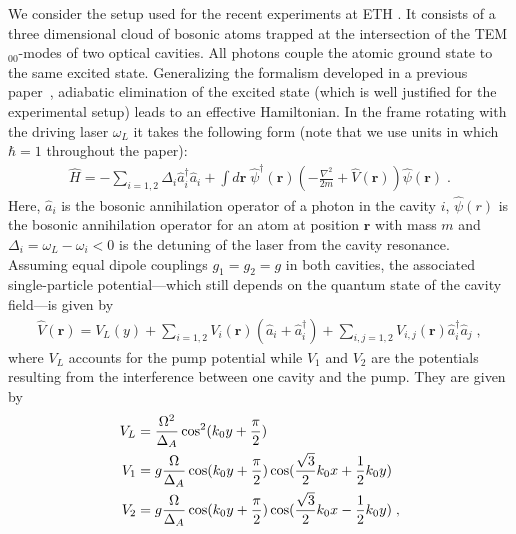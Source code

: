 \documentclass[12pt]{iopart}
\begin{document}
We consider the setup used for the recent experiments at ETH
\cite{leonard2016supersolid,leonard_supersolid_goldstone}. It
consists of a three dimensional cloud of bosonic atoms trapped at the intersection of the
TEM$_{00}$-modes of two optical cavities. All photons couple the atomic ground state to the same excited state. 
Generalizing the formalism developed in a previous paper~\cite{piazza_bose}, adiabatic elimination of the excited state (which is well justified for the experimental setup) leads to an effective Hamiltonian. In the frame rotating with the driving laser $\omega_L$ it takes the following form (note that we use units in which $\hbar=1$ throughout the paper):  
\begin{align}
\label{eq:ham}
\hat{H}=-\sum_{i=1,2}\Delta_i\hat{a}_i^\dag \hat{a}_i+\int d\mathbf{r}\; \hat{\psi}^\dag(\mathbf{r})\left(-\frac{\nabla^2}{2m}+\hat{V}(\mathbf{r})\right)\hat{\psi}(\mathbf{r})\; .
\end{align}
Here, $\hat{a}_i$ is the bosonic annihilation operator of a photon in the
cavity $i$, $\hat{\psi}(r)$ is the bosonic annihilation operator for an
atom at position $\mathbf{r}$ with mass $m$ and $\Delta_i=\omega_L-\omega_i<0$ is the detuning of the laser from the cavity resonance.
Assuming equal dipole couplings $g_1=g_2=g$ in both cavities, 
the associated single-particle potential---which still depends on the quantum state of the cavity field---is given by 
\begin{align}
\label{eq:pot_2cav}
\hat{V}(\mathbf{r})=V_L(y)+\sum_{i=1,2} V_i(\mathbf{r})\left(\hat{a}_i+\hat{a}^\dag_i\right)+\sum_{i,j=1,2}V_{i,j}(\mathbf{r})\hat{a}^\dag_i\hat{a}_j\;,
\end{align}
where $V_L$ accounts for the pump potential while $V_{1}$ and $V_{2}$ are 
the potentials resulting from the interference between one cavity and the pump. They are given by  
\begin{align}
V_L&=\frac{\Omega^2}{\Delta_A}\cos^2(k_0y+\frac{\pi}{2})\notag\\
V_1&=g\frac{\Omega}{\Delta_A}\cos(k_0y+\frac{\pi}{2})
  \cos(\frac{\sqrt{3}}{2}k_0x+\frac{1}{2}k_0y)\notag\\
V_2&=g\frac{\Omega}{\Delta_A}\cos(k_0y+\frac{\pi}{2})
  \cos(\frac{\sqrt{3}}{2}k_0x-\frac{1}{2}k_0y)\;,
\end{align}
\end{document}
